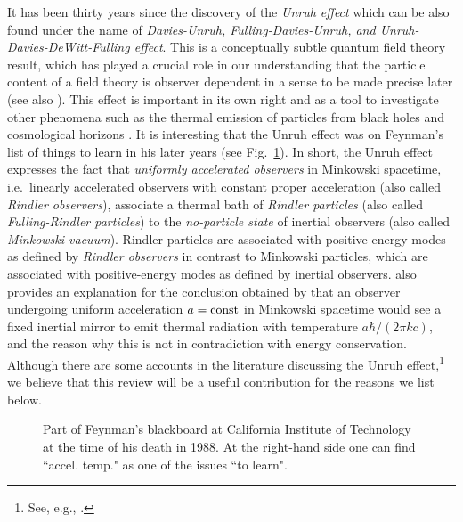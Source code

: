 \documentclass[12pt,nofootinbib,floatfix,aps,prd,showpacs,amsmath,amssymb,eqsecnum]{revtex4-2}
\let\cite\citep
\begin{document}
It has been thirty years since the discovery of the {\em Unruh
effect} \cite{Unruh76} which can be also found under the name of 
{\em Davies-Unruh, Fulling-Davies-Unruh, {\rm and} 
Unruh-Davies-DeWitt-Fulling effect}. This is a conceptually subtle 
quantum field theory result, which has played a crucial role 
in our understanding that the particle content of a field 
theory is observer dependent in a sense to be made precise 
later \cite{Fulling73} (see also \textcite{Unruh77}). This effect
is important 
in its own right and as a tool to investigate other phenomena 
such as the thermal emission of particles from black holes 
\cite{Hawking74, Hawking75} and cosmological horizons 
\cite{Gibbonsetal77}. 
It is interesting that the Unruh effect was on Feynman's list of things
to learn in his later years (see Fig.~\ref{feyn1}).
In short, the Unruh effect expresses the fact that {\em uniformly 
accelerated observers} in Minkowski spacetime, i.e.~linearly 
accelerated observers with constant proper acceleration (also called 
{\em Rindler observers}), associate a thermal bath of {\em Rindler 
particles} (also called {\em Fulling-Rindler particles}) 
to the {\em no-particle state} of inertial observers
(also called {\em Minkowski vacuum}). 
Rindler particles are associated with positive-energy modes as 
defined by {\em Rindler observers} in contrast to Minkowski particles, 
which are associated with positive-energy modes as defined by inertial 
observers. \textcite{Unruh76} also provides an explanation for 
the conclusion obtained by \textcite{Davies75} 
that an observer undergoing uniform acceleration $a = {\rm const}$ 
in Minkowski spacetime would see a fixed inertial mirror to emit 
thermal radiation with temperature $a \hbar/(2 \pi k c )$, and the reason 
why this is not in contradiction with energy conservation. 
Although there are some accounts in the literature discussing the 
Unruh effect,\footnote{See, e.g.,
\textcite{Birrelletal82,Fullingetal87,Takagi86,
          Ginzburgetal87,WaldQFTCS,Sciamaetal81}.
                       }
we believe that this review will be a useful contribution 
for the reasons we list below. 
\begin{figure}[t]
\caption{\label{feyn1} Part of Feynman's blackboard at California
Institute of Technology 
at the time of his death in 1988. At the right-hand side 
one can find ``accel. temp." as one of the issues ``to learn".}
\end{figure}
\end{document}

